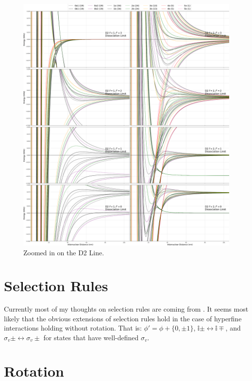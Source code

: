 \documentclass[prl, longbibliography]{revtex4-2}
\begin{document}
\begin{figure}
  \includegraphics[width=\linewidth]{Symmetrized_Hyperfine_Splitting_D2_Zoom.png}
  \caption{Zoomed in on the D2 Line.}
  \label{fig:boat1}
\end{figure}


\section{Selection Rules}
Currently most of my thoughts on selection rules are coming from \cite{herzberg_spectra_1939}. It seems most likely that the obvious extensions of selection rules hold in the case of hyperfine interactions holding without rotation. That is: $\phi'=\phi+\{0,\pm 1\}$, $\mathbb{i}\pm\leftrightarrow\mathbb{i}\mp$, and $\sigma_v\pm\leftrightarrow\sigma_v\pm$ for states that have well-defined $\sigma_v$. 

\section{Rotation}
\end{document}
